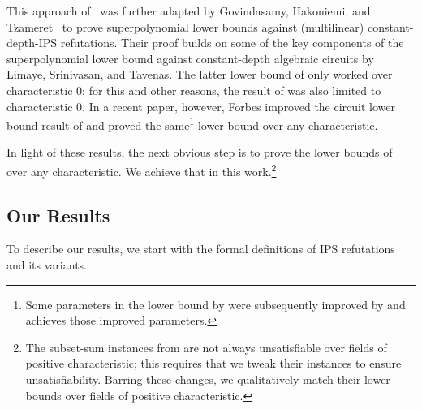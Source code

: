\documentclass[11pt]{article}
\begin{document}
This approach of~\cite{FSTW21} was further adapted by Govindasamy, Hakoniemi, and Tzameret~\cite{GHT} to prove superpolynomial lower bounds against (multilinear) constant-depth-IPS refutations. Their proof builds on some of the key components of the superpolynomial lower bound against constant-depth algebraic circuits by Limaye, Srinivasan, and Tavenas. The latter lower bound of \cite{LST} only worked over characteristic $0$; for this and other reasons, the result of \cite{GHT} was also limited to characteristic $0$. In a recent paper, however, Forbes \cite{Forbes-LST-CCC} improved the circuit lower bound result of \cite{LST} and proved the same\footnote{Some parameters in the lower bound by \cite{LST} were subsequently improved by \cite{BDS24} and \cite{Forbes-LST-CCC} achieves those improved parameters.} lower bound over any characteristic. 

In light of these results, the next obvious step is to prove the lower bounds of~\cite{FSTW21,GHT} over any characteristic. We achieve that in this work.\footnote{The subset-sum instances from \cite{FSTW21,GHT} are not always unsatisfiable over fields of positive characteristic; this requires that we tweak their instances to ensure unsatisfiability. Barring these changes, we qualitatively match their lower bounds over fields of positive characteristic.}







    
    
    









\subsection{Our Results}
\label{sec:results}
To describe our results, we start with the formal definitions of IPS refutations and its variants. 
\end{document}
